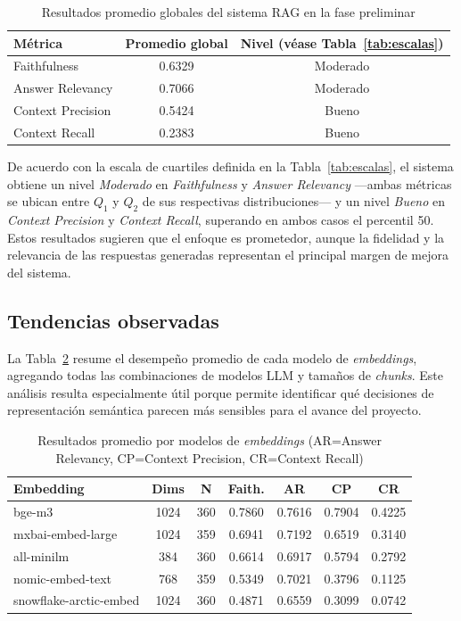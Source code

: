 \documentclass{article}
\begin{document}
\begin{table}[H]
\centering
\begin{tabular}{|l|c|c|}
\hline
\textbf{Métrica} & \textbf{Promedio global} & \textbf{Nivel (véase Tabla~\ref{tab:escalas})} \\
\hline
Faithfulness        & 0.6329 & Moderado \\
Answer Relevancy    & 0.7066 & Moderado \\
Context Precision   & 0.5424 & Bueno    \\
Context Recall      & 0.2383 & Bueno    \\
\hline
\end{tabular}
\caption{Resultados promedio globales del sistema RAG en la fase preliminar}
\label{tab:resultados-globales}
\end{table}

De acuerdo con la escala de cuartiles definida en la Tabla~\ref{tab:escalas}, el sistema obtiene un nivel \textit{Moderado} en \textit{Faithfulness} y \textit{Answer Relevancy} —ambas métricas se ubican entre $Q_1$ y $Q_2$ de sus respectivas distribuciones— y un nivel \textit{Bueno} en \textit{Context Precision} y \textit{Context Recall}, superando en ambos casos el percentil 50. Estos resultados sugieren que el enfoque es prometedor, aunque la fidelidad y la relevancia de las respuestas generadas representan el principal margen de mejora del sistema.

\subsection{Tendencias observadas}

La Tabla~\ref{tab:embeddings-promedio} resume el desempeño promedio de cada modelo de \textit{embeddings}, agregando todas las combinaciones de modelos LLM y tamaños de \textit{chunks}. Este análisis resulta especialmente útil porque permite identificar qué decisiones de representación semántica parecen más sensibles para el avance del proyecto.

\begin{table}[H]
\centering
\begin{tabular}{|l|c|c|c|c|c|c|}
\hline
\textbf{Embedding} & \textbf{Dims} & \textbf{N} & \textbf{Faith.} & \textbf{AR} & \textbf{CP} & \textbf{CR} \\
\hline
bge-m3 & 1024 & 360 & 0.7860 & 0.7616 & 0.7904 & 0.4225 \\
mxbai-embed-large & 1024 & 359 & 0.6941 & 0.7192 & 0.6519 & 0.3140 \\
all-minilm & 384 & 360 & 0.6614 & 0.6917 & 0.5794 & 0.2792 \\
nomic-embed-text & 768 & 359 & 0.5349 & 0.7021 & 0.3796 & 0.1125 \\
snowflake-arctic-embed & 1024 & 360 & 0.4871 & 0.6559 & 0.3099 & 0.0742 \\
\hline
\end{tabular}
\caption{Resultados promedio por modelos de \textit{embeddings} (AR=Answer Relevancy, CP=Context Precision, CR=Context Recall)}
\label{tab:embeddings-promedio}
\end{table}
\end{document}
